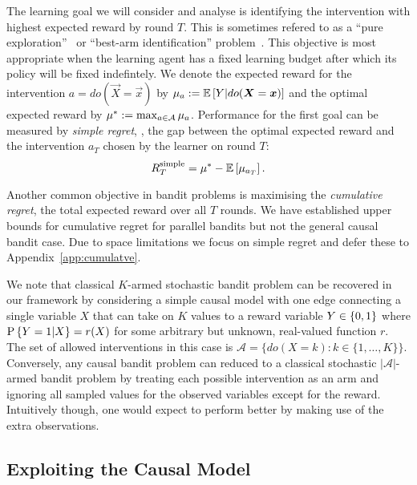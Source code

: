 The learning goal we will consider and analyse is identifying the intervention with highest expected reward by round $T$.
This is sometimes refered to as a ``pure exploration''~\citep{Bubeck2009} or ``best-arm identification'' problem~\citep{Gabillon2012}.
This objective is most appropriate when the learning agent has a fixed learning budget after which its policy will be fixed indefintely. 
We denote the expected reward for the intervention $a = do(\vec{X} = \vec{x})$ by $\mu_{a} := \E{Y | do(\vec{X} = \vec{x})}$ and the optimal expected reward by $\mu^* := \max_{a\in\actions} \mu_{a}$.
Performance for the first goal can be measured by \emph{simple regret}, \ie, the gap between the optimal expected reward and the intervention $a_T$ chosen by the learner on round $T$:
\begin{equation}
\label{eq:regret-simple}
	\simpleregret = \mu^* - \E{\mu_{a_T}}.
\end{equation}

Another common objective in bandit problems is maximising the \emph{cumulative regret}, the total expected reward over all $T$ rounds. 
We have established upper bounds for cumulative regret for parallel bandits but not the general causal bandit case.
Due to space limitations we focus on simple regret and defer these to Appendix~\ref{app:cumulatve}.

We note that classical $K$-armed stochastic bandit problem can be recovered in our framework by considering a simple causal model with one edge connecting a single variable $X$ that can take on $K$ values to a reward variable $Y \in \set{0,1}$ where $\P{Y = 1|X} = r(X)$ for some arbitrary but unknown, real-valued function $r$.
The set of allowed interventions in this case is $\mathcal{A} = \{ do(X = k) \colon k \in \{1, \ldots, K\}\}$.
Conversely, any causal bandit problem can reduced to a classical stochastic $|\mathcal{A}|$-armed bandit problem by treating each possible intervention as an arm and ignoring all sampled values for the observed variables except for the reward.
Intuitively though, one would expect to perform better by making use of the extra observations.





\subsection{Exploiting the Causal Model}

